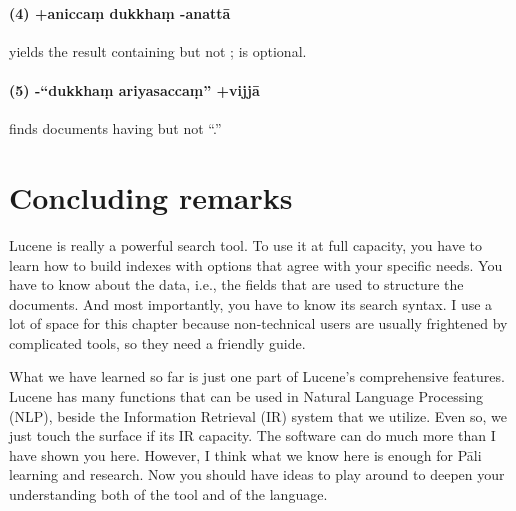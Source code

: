 \paragraph{(4) +aniccaṃ dukkhaṃ -anattā} yields the result containing  but not ;  is optional. 
\paragraph{(5) -``dukkhaṃ ariyasaccaṃ'' +vijjā} finds documents having  but not ``.''

\section{Concluding remarks}

Lucene is really a powerful search tool. To use it at full capacity, you have to learn how to build indexes with options that agree with your specific needs. You have to know about the data, i.e., the fields that are used to structure the documents. And most importantly, you have to know its search syntax. I use a lot of space for this chapter because non-technical users are usually frightened by complicated tools, so they need a friendly guide. 

What we have learned so far is just one part of Lucene's comprehensive features. Lucene has many functions that can be used in Natural Language Processing (NLP), beside the Information Retrieval (IR) system that we utilize. Even so, we just touch the surface if its IR capacity. The software can do much more than I have shown you here. However, I think what we know here is enough for Pāli learning and research. Now you should have ideas to play around to deepen your understanding both of the tool and of the language.
